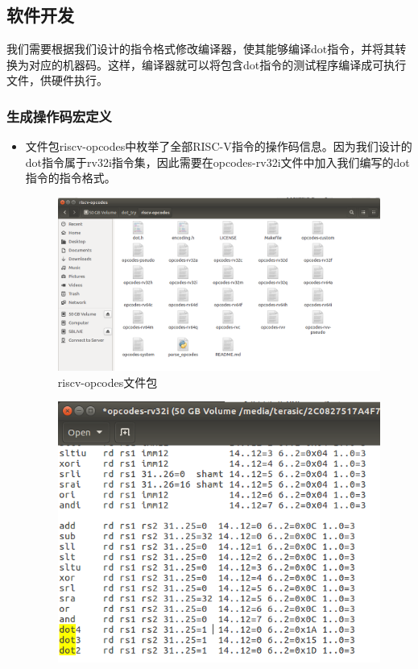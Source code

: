\documentclass[a4paper, 14pt, oneside]{book} %
\numberwithin{equation}{subsection}
\begin{document}
	\subsection{软件开发}
	我们需要根据我们设计的指令格式修改编译器，使其能够编译dot指令，并将其转换为对应的机器码。这样，编译器就可以将包含dot指令的测试程序编译成可执行文件，供硬件执行。
	\subsubsection{生成操作码宏定义}
		\begin{itemize}
			\item 文件包riscv-opcodes中枚举了全部RISC-V指令的操作码信息。因为我们设计的dot指令属于rv32i指令集，因此需要在opcodes-rv32i文件中加入我们编写的dot指令的指令格式。
				\begin{figure}[H]
					\centering  
					\includegraphics[scale=0.3]{img/1.png}   
					\caption{riscv-opcodes文件包}
				\end{figure}
				\begin{figure}[H]
					\centering  
					\includegraphics[scale=0.5]{img/2.png}   

\end{figure}
\end{itemize}
\end{document}
